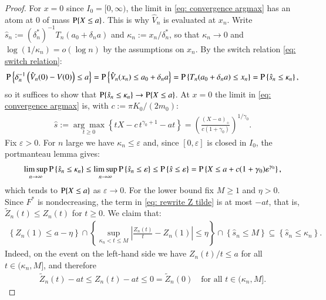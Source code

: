 \begin{proof}
For $x=0$ since $I_0=[0,\infty)$, the limit in \eqref{eq: convergence argmax} has an atom at $0$ of mass $\mathrm{P}\{X \leq a\}$. This is why $\hat{V}_n$ is evaluated at $x_n$. Write $\hat{s}_n := (\delta^*_n)^{-1} T_n(a_0+\delta_n a)$ and $\kappa_n := x_n/\delta^*_n$, so that $\kappa_n \rightarrow 0$ and $\log(1/\kappa_n) = o(\log n)$ by the assumptions on $x_n$. By the switch relation \eqref{eq: switch relation}:
\begin{align*}
\mathrm{P}\left\{\delta_n^{-1}\left(\hat{V}_n(0)-V(0)\right) \leq a\right\} = \mathrm{P}\left\{\hat{V}_n(x_n) \leq a_0+\delta_n a\right\} = \mathrm{P}\left\{T_n(a_0+\delta_n a) \leq x_n\right\} = \mathrm{P}\left\{\hat{s}_n \leq \kappa_n\right\},
\end{align*}
so it suffices to show that $\mathrm{P}\{\hat{s}_n \leq \kappa_n\} \rightarrow \mathrm{P}\{X \leq a\}$. At $x=0$ the limit in \eqref{eq: convergence argmax} is, with $c := \pi K_0/(2m_0)$:
\begin{align*}
\hat{s} := \underset{t \geq 0}{\arg\max}\left\{tX - c\, t^{\gamma_0+1} - at\right\} = \left(\frac{(X-a)_+}{c(1+\gamma_0)}\right)^{1/\gamma_0}.
\end{align*}
Fix $\varepsilon>0$. For $n$ large we have $\kappa_n \leq \varepsilon$ and, since $[0,\varepsilon]$ is closed in $I_0$, the portmanteau lemma gives:
\begin{align*}
\limsup_{n \rightarrow \infty} \mathrm{P}\left\{\hat{s}_n \leq \kappa_n\right\} \leq \limsup_{n \rightarrow \infty} \mathrm{P}\left\{\hat{s}_n \leq \varepsilon\right\} \leq \mathrm{P}\left\{\hat{s} \leq \varepsilon\right\} = \mathrm{P}\left\{X \leq a + c(1+\gamma_0)\varepsilon^{\gamma_0}\right\},
\end{align*}
which tends to $\mathrm{P}\{X \leq a\}$ as $\varepsilon \rightarrow 0$. For the lower bound fix $M \geq 1$ and $\eta>0$. Since $F^*$ is nondecreasing, the term in \eqref{eq: rewrite Z tilde} is at most $-at$, that is, $\tilde{Z}_n(t) \leq Z_n(t)$ for $t \geq 0$. We claim that:
\begin{align*}
\left\{Z_n(1) \leq a-\eta\right\} \cap \left\{\sup_{\kappa_n < t \leq M}\left|\frac{Z_n(t)}{t}-Z_n(1)\right| \leq \eta\right\} \cap \left\{\hat{s}_n \leq M\right\} \subseteq \left\{\hat{s}_n \leq \kappa_n\right\}.
\end{align*}
Indeed, on the event on the left-hand side we have $Z_n(t)/t \leq a$ for all $t \in (\kappa_n, M]$, and therefore
\begin{align*}
\tilde{Z}_n(t) - at \leq Z_n(t) - at \leq 0 = \tilde{Z}_n(0) \quad \text{for all } t \in (\kappa_n, M].
\end{align*}

\end{proof}

